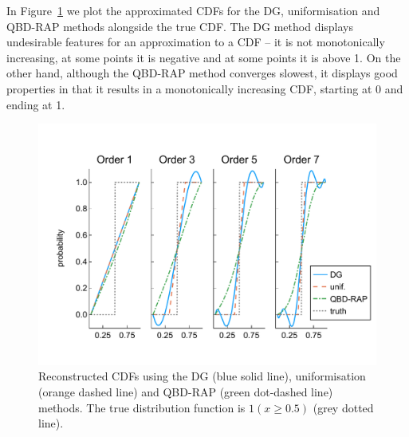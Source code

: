 In Figure~\ref{fig: pdf comp fun 1} we plot the approximated CDFs for the DG, uniformisation and QBD-RAP methods alongside the true CDF. The DG method displays undesirable features for an approximation to a CDF -- it is not monotonically increasing, at some points it is negative and at some points it is above 1. On the other hand, although the QBD-RAP method converges slowest, it displays good properties in that it results in a monotonically increasing CDF, starting at 0 and ending at 1. 
\begin{figure}
	\centering
	\includegraphics[width=\textwidth]{chapter5/figs/comp/fun1/cdfs_formatted.pdf}
	\caption{Reconstructed CDFs using the DG (blue solid line), uniformisation (orange dashed line) and QBD-RAP (green dot-dashed line) methods. The true distribution function is \(1(x\geq 0.5)\) (grey dotted line).}
	\label{fig: pdf comp fun 1}
\end{figure} 

